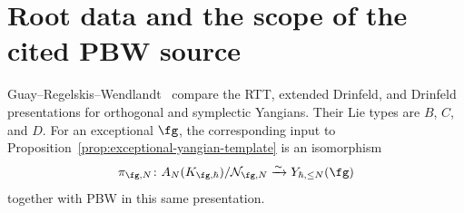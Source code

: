 \section{Root data and the scope of the cited PBW source}
\label{sec:exceptional-yangian-pbw}

\begin{proposition}
\label{thm:exceptional-yangian-pbw-grw18}
Guay--Regelskis--Wendlandt~\cite{GRW18} compare the RTT, extended
Drinfeld, and Drinfeld presentations for orthogonal and symplectic
Yangians.  Their Lie types are $B$, $C$, and $D$.  For an exceptional
$\fg$, the corresponding input to
Proposition~\ref{prop:exceptional-yangian-template} is an isomorphism
\[
\pi_{\fg,N}\colon
A_N(K_{\fg,\hbar})/\mathcal N_{\fg,N}
\xrightarrow{\sim}Y_{\hbar,\le N}(\fg)
\]
together with PBW in this same presentation.
\end{proposition}

